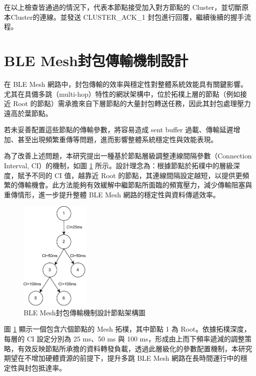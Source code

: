 \begin{ZhChapter}
在以上檢查皆通過的情況下，代表本節點接受加入對方節點的 Cluster，並切斷原本Cluster的連線。並發送 CLUSTER\_ACK\_1 封包進行回覆，繼續後續的握手流程。

\section{BLE Mesh封包傳輸機制設計}
在 BLE Mesh 網路中，封包傳輸的效率與穩定性對整體系統效能具有關鍵影響。尤其在具備多跳（multi-hop）特性的網狀架構中，位於拓樸上層的節點（例如接近 Root 的節點）需承擔來自下層節點的大量封包轉送任務，因此其封包處理壓力遠高於葉節點。

若未妥善配置這些節點的傳輸參數，將容易造成 sent buffer 過載、傳輸延遲增加、甚至出現頻繁重傳等問題，進而影響整體系統穩定性與效能表現。

為了改善上述問題，本研究提出一種基於節點層級調整連線間隔參數（Connection Interval, CI）的機制，如圖 \ref{fig: BLE Mesh封包傳輸機制設計節點架構圖} 所示。設計理念為：根據節點於拓樸中的層級深度，賦予不同的 CI 值，越靠近 Root 的節點，其連線間隔設定越短，以提供更頻繁的傳輸機會。此方法能夠有效緩解中繼節點所面臨的頻寬壓力，減少傳輸阻塞與重傳情形，進一步提升整體 BLE Mesh 網路的穩定性與資料傳遞效率。

\begin{figure}[H]
    \centering
    \includegraphics[width = 0.3\textwidth]{image/BLE Mesh封包傳輸機制設計節點架構圖.png}
    \caption{BLE Mesh封包傳輸機制設計節點架構圖}
    \label{fig: BLE Mesh封包傳輸機制設計節點架構圖}
\end{figure}

圖 \ref{fig: BLE Mesh封包傳輸機制設計節點架構圖} 顯示一個包含六個節點的 Mesh 拓樸，其中節點 1 為 Root。依據拓樸深度，每層的 CI 設定分別為 25 ms、50 ms 與 100 ms，形成由上而下頻率遞減的調整策略，有效反映節點所承擔的資料轉發負載，透過此層級化的參數配置機制，本研究期望在不增加硬體資源的前提下，提升多跳 BLE Mesh 網路在長時間運行中的穩定性與封包抵達率。

\end{ZhChapter}
